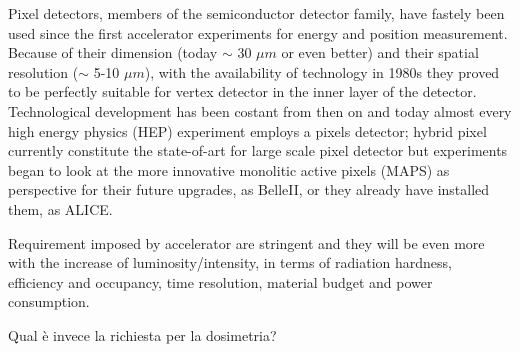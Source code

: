 Pixel detectors, members of the semiconductor detector family, have fastely been used since the first accelerator experiments for energy and position measurement. 
Because of their dimension (today $\sim$ 30 $\mu m$ or even better) and their spatial resolution ($\sim$ 5-10 $\mu m$), with the availability of technology in 1980s they proved to be perfectly suitable for vertex detector in the inner layer of the detector.\\
Technological development has been costant from then on and today almost every high energy physics (HEP) experiment employs a pixels detector; hybrid pixel currently constitute the state-of-art for large scale pixel detector but experiments began to look at the more innovative monolitic active pixels (MAPS) as perspective for their future upgrades, as BelleII, or they already have installed them, as ALICE.

Requirement imposed by accelerator are stringent and they will be even more with the increase of luminosity/intensity, in terms of radiation hardness, efficiency and occupancy, time resolution, material budget and power consumption.

Qual è invece la richiesta per la dosimetria? \\






